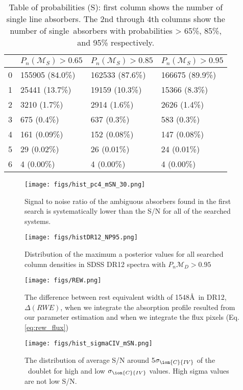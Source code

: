 \documentclass[fleqn,usenatbib]{mnras}
\newcommand{\civ}{\ion{C}{IV}}
\newcommand{\sciv}{\sigma_{\civ}}
\newcommand{\model}{\mathcal{M}}
\begin{document}
\begin{table}
  \caption{Table of probabilities (S): first column shows the number of single line absorbers. The 2nd through 4th
   columns   show the number of single~absorbers with probabilities > 65\%, 85\%, and 95\% respectively. } %
  \label{tab:p_L1}
    \begin{tabular}{|l|l|l|l|}
    \hline
    \civ &	$P_n(\model_S)>0.65$ &	$P_n(\model_S)>0.85$&	$P_n(\model_S)>0.95$\\ \hline
    0 &	155905 (84.0\%) &	162533 (87.6\%) &	166675 (89.9\%)\\
    1	& 25441	(13.7\%) & 19159	(10.3\%) & 15366 (8.3\%)\\
    2	& 3210 (1.7\%) &	2914 (1.6\%)	& 2626 (1.4\%)\\
    3	& 675	(0.4\%) & 637 (0.3\%) &	583 (0.3\%)\\
    4 &	161 (0.09\%) &	152 (0.08\%) &	147 (0.08\%)\\
    5	& 29 (0.02\%)	& 26	(0.01\%) & 24 (0.01\%)\\
    6 &	4	(0.00\%) & 4 (0.00\%) &	4 (0.00\%)\\
      \end{tabular}
\end{table}

\begin{figure}
  \texttt{[image: figs/hist\_pc4\_mSN\_30.png]}
\caption{Signal to noise ratio of the ambiguous absorbers found in the first search is systematically lower than
the S/N for all of the searched systems.}
\label{fig:mSNpc4}
\end{figure}

\begin{figure}
  \texttt{[image: figs/histDR12\_NP95.png]}
  \caption{Distribution of the maximum a posterior values for all
  searched column densities in SDSS DR12 spectra with
  $P_n{\model_D}>0.95$}
  \label{fig:DR12N}
\end{figure}


\begin{figure}
  \texttt{[image: figs/REW.png]}
  \caption{The difference between rest equivalent width of 1548\AA\ in DR12, $\Delta(RWE)$,
  when we integrate the absorption profile resulted from our parameter estimation
  and when we integrate the flux pixels (Eq. \ref{eq:rew_flux})}
  \label{fig:DZdr12}
\end{figure}


\begin{figure}
  \texttt{[image: figs/hist\_sigmaCIV\_mSN.png]}
  \caption{The distribution of average S/N around 5$\sciv$ of the \civ\ doublet for high and
  low $\sciv$ values. High sigma values are not low S/N. }
  \label{fig:mSN-sgima}
\end{figure}
\end{document}
